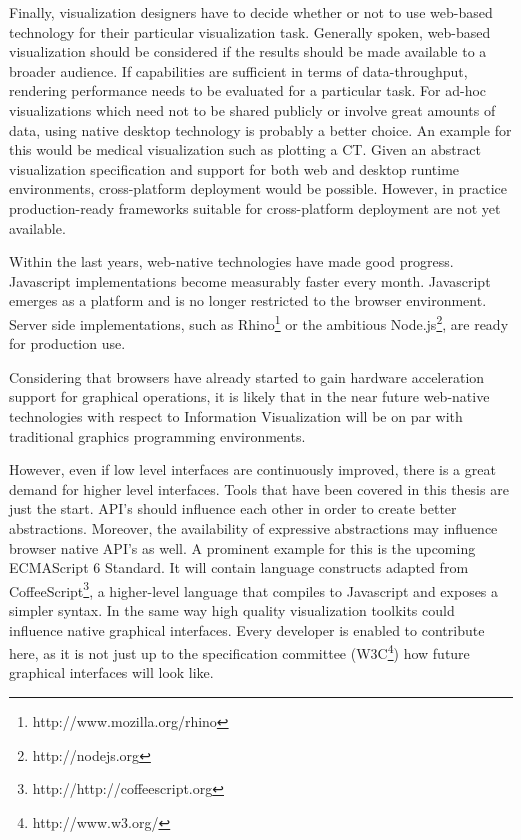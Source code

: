 Finally, visualization designers have to decide whether or not to use web-based technology for their particular visualization task. Generally spoken, web-based visualization should be considered if the results should be made available to a broader audience. If capabilities are sufficient in terms of data-throughput, rendering performance needs to be evaluated for a particular task. For ad-hoc visualizations which need not to be shared publicly or involve great amounts of data, using native desktop technology is probably a better choice. An example for this would be medical visualization such as plotting a CT. Given an abstract visualization specification and support for both web and desktop runtime environments, cross-platform deployment would be possible. However, in practice production-ready frameworks suitable for cross-platform deployment are not yet available.

\SuperPar Within the last years, web-native technologies have made good progress. Javascript implementations become measurably faster every month. Javascript emerges as a platform and is no longer restricted to the browser environment. Server side implementations, such as Rhino\footnote{http://www.mozilla.org/rhino} or the ambitious Node.js\footnote{http://nodejs.org}, are ready for production use.

Considering that browsers have already started to gain hardware acceleration support for graphical operations, it is likely that in the near future web-native technologies with respect to Information Visualization will be on par with traditional graphics programming environments.

However, even if low level interfaces are continuously improved, there is a great demand for higher level interfaces. Tools that have been covered in this thesis are just the start. API's should influence each other in order to create better abstractions. Moreover, the availability of expressive abstractions may influence browser native API's as well. A prominent example for this is the upcoming ECMAScript 6 Standard. It will contain language constructs adapted from CoffeeScript\footnote{http://http://coffeescript.org}, a higher-level language that compiles to Javascript and exposes a simpler syntax. In the same way high quality visualization toolkits could influence native graphical interfaces. Every developer is enabled to contribute here, as it is not just up to the specification committee (W3C\footnote{http://www.w3.org/}) how future graphical interfaces will look like.
